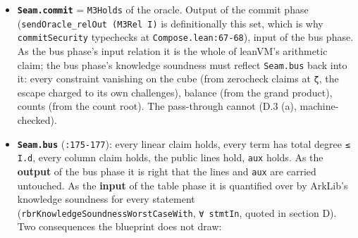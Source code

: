 \begin{itemize}
\item \textbf{\texttt{Seam.\allowbreak{}commit}} = \texttt{M3Holds} of the oracle. Output of the commit phase (\texttt{sendOracle\_\allowbreak{}relOut (\allowbreak{}M3Rel I)} is definitionally this set, which is why \texttt{commitSecurity} typechecks at \texttt{Compose.\allowbreak{}lean:67-{}68}), input of the bus phase. As the bus phase's input relation it is the whole of leanVM's arithmetic claim; the bus phase's knowledge soundness must reflect \texttt{Seam.\allowbreak{}bus} back into it: every constraint vanishing on the cube (from zerocheck claims at \texttt{ζ}, the escape charged to its own challenges), balance (from the grand product), counts (from the count root). The pass-through cannot (D.3 (a), machine-checked).
\item \textbf{\texttt{Seam.\allowbreak{}bus}} (\texttt{:175-{}177}): every linear claim holds, every term has total degree \texttt{≤ I.\allowbreak{}d}, every column claim holds, the public lines hold, \texttt{aux} holds. As the \textbf{output} of the bus phase it is right that the lines and \texttt{aux} are carried untouched. As the \textbf{input} of the table phase it is quantified over by ArkLib's knowledge soundness for every statement (\texttt{r\allowbreak{}b\allowbreak{}r\allowbreak{}K\allowbreak{}n\allowbreak{}o\allowbreak{}w\allowbreak{}l\allowbreak{}e\allowbreak{}d\allowbreak{}g\allowbreak{}e\allowbreak{}S\allowbreak{}o\allowbreak{}u\allowbreak{}n\allowbreak{}d\allowbreak{}n\allowbreak{}e\allowbreak{}s\allowbreak{}s\allowbreak{}W\allowbreak{}o\allowbreak{}r\allowbreak{}s\allowbreak{}t\allowbreak{}C\allowbreak{}a\allowbreak{}s\allowbreak{}e\allowbreak{}W\allowbreak{}i\allowbreak{}t\allowbreak{}h}, \texttt{∀ stmtIn}, quoted in section D). Two consequences the blueprint does not draw:


\end{itemize}
